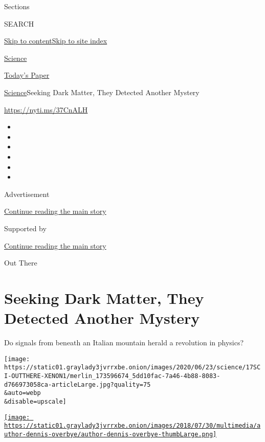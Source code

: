 Sections

SEARCH

\protect\hyperlink{site-content}{Skip to
content}\protect\hyperlink{site-index}{Skip to site index}

\href{https://www.nytimes3xbfgragh.onion/section/science}{Science}

\href{https://myaccount.nytimes3xbfgragh.onion/auth/login?response_type=cookie\&client_id=vi}{}

\href{https://www.nytimes3xbfgragh.onion/section/todayspaper}{Today's
Paper}

\href{/section/science}{Science}\textbar{}Seeking Dark Matter, They
Detected Another Mystery

\url{https://nyti.ms/37CnALH}

\begin{itemize}
\item
\item
\item
\item
\item
\item
\end{itemize}

Advertisement

\protect\hyperlink{after-top}{Continue reading the main story}

Supported by

\protect\hyperlink{after-sponsor}{Continue reading the main story}

Out There

\hypertarget{seeking-dark-matter-they-detected-another-mystery}{%
\section{Seeking Dark Matter, They Detected Another
Mystery}\label{seeking-dark-matter-they-detected-another-mystery}}

Do signals from beneath an Italian mountain herald a revolution in
physics?

\texttt{[image: https://static01.graylady3jvrrxbe.onion/images/2020/06/23/science/17SCI-OUTTHERE-XENON1/merlin\_173596674\_5dd10fac-7a46-4b88-8083-d766973058ca-articleLarge.jpg?quality=75\\\&auto=webp\\\&disable=upscale]}

\href{https://www.nytimes3xbfgragh.onion/by/dennis-overbye}{\texttt{[image: https://static01.graylady3jvrrxbe.onion/images/2018/07/30/multimedia/author-dennis-overbye/author-dennis-overbye-thumbLarge.png]}}

